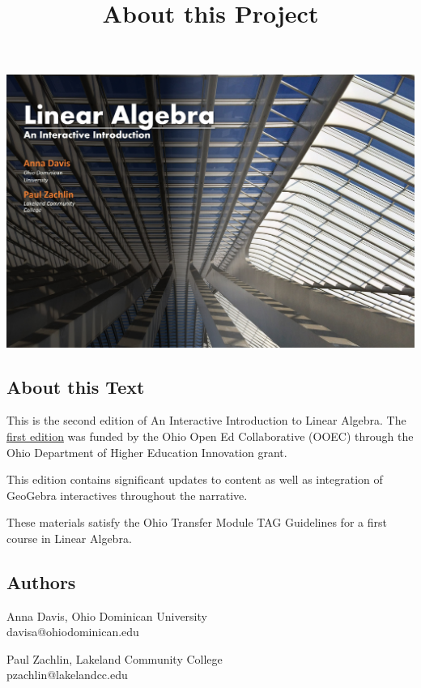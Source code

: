 \documentclass{ximera}
\title{About this Project} \license{CC BY-NC-SA 4.0}
\begin{document}
\begin{abstract}
\end{abstract}
\maketitle

\begin{image}
\includegraphics{BookCover1.jpg}
\end{image}

\subsection{About this Text}
This is the second edition of An Interactive Introduction to Linear Algebra.  The \href{https://ximera.osu.edu/la/LinearAlgebra}{first edition} was funded by the Ohio Open Ed Collaborative (OOEC) through the Ohio Department of Higher Education Innovation grant. 

This edition contains significant updates to content as well as integration of GeoGebra interactives throughout the narrative.

These materials satisfy the Ohio Transfer Module TAG Guidelines for a first course in Linear Algebra.  

\subsection{Authors}
Anna Davis, Ohio Dominican University\\
davisa@ohiodominican.edu

Paul Zachlin, Lakeland Community College\\
pzachlin@lakelandcc.edu
\end{document}
